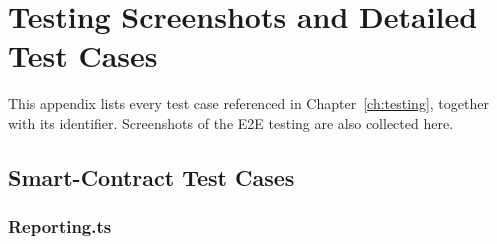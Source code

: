 \chapter{Testing Screenshots and Detailed Test Cases}
\label{app:test-cases}

This appendix lists every test case referenced in Chapter~\ref{ch:testing}, together with its identifier. Screenshots of the \ac{E2E} testing are also collected here.

\section{Smart-Contract Test Cases}
\label{apndx:smart-contract-test-cases}
\subsection{Reporting.ts}


